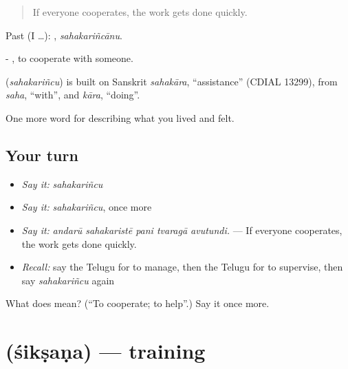\begin{quote}
If everyone cooperates, the work gets done quickly.
\end{quote}

Past (I …): , \emph{sahakariñcānu}.

- , to cooperate with someone.

\begin{cousinweb}
\textbf{} (\emph{sahakariñcu}) is built on Sanskrit \emph{sahakāra}, \textquotedblleft{}assistance\textquotedblright{} (CDIAL 13299), from \emph{saha}, \textquotedblleft{}with\textquotedblright{}, and \emph{kāra}, \textquotedblleft{}doing\textquotedblright{}.
\end{cousinweb}

\begin{grammarlens}[title={What you've built}]
One more word for describing what you lived and felt.
\end{grammarlens}

\subsection*{Your turn}
\begin{itemize}
\raggedright
  \item \emph{Say it:} \emph{sahakariñcu}
  \item \emph{Say it:} \emph{sahakariñcu}, once more
  \item \emph{Say it:} \emph{andarū sahakaristē pani tvaragā avutundi.} — If everyone cooperates, the work gets done quickly.
  \item \emph{Recall:} say the Telugu for to manage, then the Telugu for to supervise, then say \emph{sahakariñcu} again
\end{itemize}

\begin{tcolorbox}[breakable,colback=teal!4,colframe=teal!35!black,title={Before you move on}]
What does  mean? (\textquotedblleft{}To cooperate; to help\textquotedblright{}.) Say it once more.
\end{tcolorbox}
\section[\texorpdfstring{\te{శిక్షణ} (śikṣaṇa)}{శిక్షణ (śikṣaṇa)}]{ (śikṣaṇa) — training}

\label{lesson:TE-C526-siksana}



